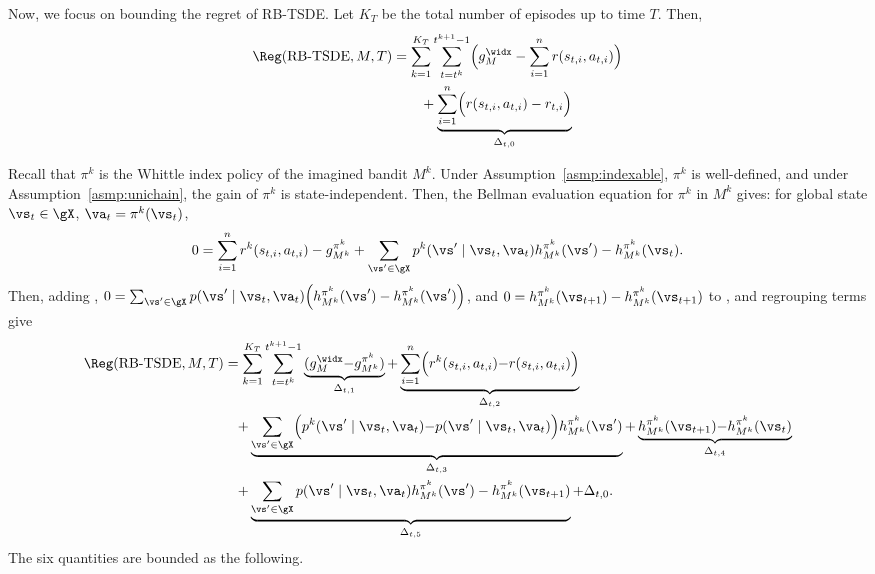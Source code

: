 Now, we focus on bounding the regret of RB-TSDE.
Let $K_T$ be the total number of episodes up to time $T$.
Then,
\begin{align}
    \Reg(\textnormal{RB-TSDE},M,T) 
    &= \sum_{k=1}^{K_T}\sum_{t=t^k}^{t^{k+1}-1} \Bigl(g^\widx_M -\sum_{i=1}^{n}r(s_{t,i},a_{t,i})\Bigr) \label{ch:restless:eq:regret1}\\
    &\qquad +\underbrace{\sum_{i=1}^{n}\Bigl(r(s_{t,i},a_{t,i})-r_{t,i}\Bigr)}_{\Delta_{t,0}} \nonumber
\end{align}

Recall that $\pi^k$ is the Whittle index policy of the imagined bandit $M^k$.
Under Assumption~\ref{asmp:indexable}, $\pi^k$ is well-defined, and under Assumption~\ref{asmp:unichain}, the gain of $\pi^k$ is state-independent.
Then, the Bellman evaluation equation for $\pi^k$ in $M^k$ gives: for global state $\vs_t\in\gX$, $\va_t=\pi^k(\vs_t)$,
\begin{equation}
    \label{eq:be_imagined}
    0 =  \sum_{i=1}^nr^k(s_{t,i}, a_{t,i}) -g^{\pi^k}_{M^k} +\sum_{\vs'\in\gX}p^k(\vs' \mid \vs_t, \va_t)h^{\pi^k}_{M^k}(\vs') -h^{\pi^k}_{M^k}(\vs_t).
\end{equation}
Then, adding , $0=\sum_{\vs'\in\gX}p(\vs' \mid \vs_t, \va_t)\Bigl(h^{\pi^k}_{M^k}(\vs')-h^{\pi^k}_{M^k}(\vs')\Bigr)$, and $0=h^{\pi^k}_{M^k}(\vs_{t+1})-h^{\pi^k}_{M^k}(\vs_{t+1})$ to , and regrouping terms give
\begin{align*}
    \Reg(\textnormal{RB-TSDE},M,T)
    &=\sum_{k=1}^{K_T}\sum_{t=t^k}^{t^{k+1}-1} \underbrace{(g^\widx_M{-}g^{\pi^k}_{M^k})}_{\Delta_{t,1}} {+}\underbrace{\sum_{i=1}^n\Bigl(r^k(s_{t,i},a_{t,i}){-}r(s_{t,i},a_{t,i})\Bigr)}_{\Delta_{t,2}} \\
    &\quad {+}\underbrace{\sum_{\vs'\in\gX}\Bigl(p^k(\vs' \mid \vs_t, \va_t){-}p(\vs' \mid \vs_t, \va_t)\Bigr)h^{\pi^k}_{M^k}(\vs')}_{\Delta_{t,3}} {+}\underbrace{h^{\pi^k}_{M^k}(\vs_{t+1}){-}h^{\pi^k}_{M^k}(\vs_{t})}_{\Delta_{t,4}} \\
    &\quad {+}\underbrace{\sum_{\vs'\in\gX} p(\vs' \mid \vs_t, \va_t)h^{\pi^k}_{M^k}(\vs')-h^{\pi^k}_{M^k}(\vs_{t+1})}_{\Delta_{t,5}} +\Delta_{t,0}.
\end{align*}
The six quantities are bounded as the following. %

